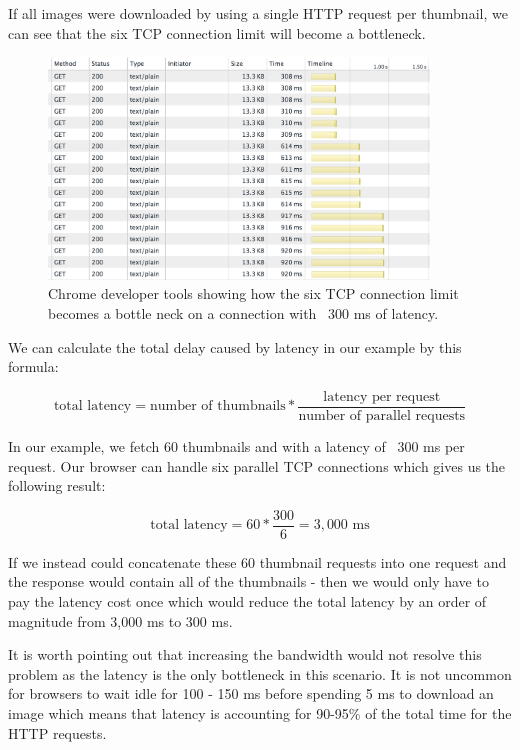 \documentclass{cslthse-msc}
\begin{document}
If all images were downloaded by using a single HTTP request per thumbnail, we can see that the six TCP connection limit will become a bottleneck.

\begin{figure}[H]
  \centering
    \begin{center}
      \includegraphics[width=0.9\textwidth]{images/chrome_latency_limit.png}
    \end{center}
  \caption{Chrome developer tools showing how the six TCP connection limit becomes a bottle neck on a connection with ~300 ms of latency.}
\end{figure}

We can calculate the total delay caused by latency in our example by this formula:

\begin{equation}
\mbox{total latency} = \mbox{number of thumbnails} * \frac{\mbox{latency per request}}{\mbox{number of parallel requests}}
\end{equation}

In our example, we fetch 60 thumbnails and with a latency of ~300 ms per request. Our browser can handle six parallel TCP connections which gives us the following result:

\begin{equation}
\mbox{total latency} = 60 * \frac{300}{6} = 3,000 \mbox{ ms}
\end{equation}

If we instead could concatenate these 60 thumbnail requests into one request and the response would contain all of the thumbnails - then we would only have to pay the latency cost once which would reduce the total latency by an order of magnitude from 3,000 ms to 300 ms.

It is worth pointing out that increasing the bandwidth would not resolve this problem as the latency is the only bottleneck in this scenario. It is not uncommon for browsers to wait idle for 100 - 150 ms before spending 5 ms to download an image which means that latency is accounting for 90-95\% of the total time for the HTTP requests\cite{latency}.
\end{document}
